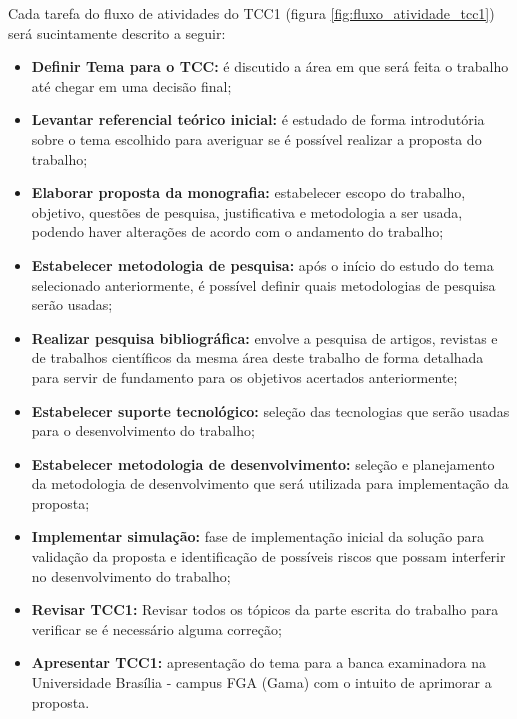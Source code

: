 Cada tarefa do fluxo de atividades do TCC1 (figura \ref{fig:fluxo_atividade_tcc1}) será sucintamente descrito a seguir:

\begin{itemize}
    \item \textbf{Definir Tema para o TCC:} é discutido a área em que será feita o trabalho até chegar em uma decisão final;

    \item \textbf{Levantar referencial teórico inicial:} é estudado de forma introdutória sobre o tema escolhido para averiguar se é possível realizar a proposta do trabalho;

    \item \textbf{Elaborar proposta da monografia:} estabelecer escopo do trabalho, objetivo, questões de pesquisa, justificativa e metodologia a ser usada, podendo haver alterações de acordo com o andamento do trabalho;

    \item \textbf{Estabelecer metodologia de pesquisa:} após o início do estudo do tema selecionado anteriormente, é possível definir quais metodologias de pesquisa serão usadas;

    \item \textbf{Realizar pesquisa bibliográfica:} envolve a pesquisa de artigos, revistas e de trabalhos científicos da mesma área deste trabalho de forma detalhada para servir de fundamento para os objetivos acertados anteriormente;

    \item \textbf{Estabelecer suporte tecnológico:} seleção das tecnologias que serão usadas para o desenvolvimento do trabalho;

    \item \textbf{Estabelecer metodologia de desenvolvimento:} seleção e planejamento da metodologia de desenvolvimento que será utilizada para implementação da proposta;

    \item \textbf{Implementar simulação:} fase de implementação inicial da solução para validação da proposta e identificação de possíveis riscos que possam interferir no desenvolvimento do trabalho;

    \item \textbf{Revisar TCC1:} Revisar todos os tópicos da parte escrita do trabalho para verificar se é necessário alguma correção;

    \item \textbf{Apresentar TCC1:} apresentação do tema para a banca examinadora na Universidade Brasília - campus FGA (Gama) com o intuito de aprimorar a proposta.

\end{itemize}

